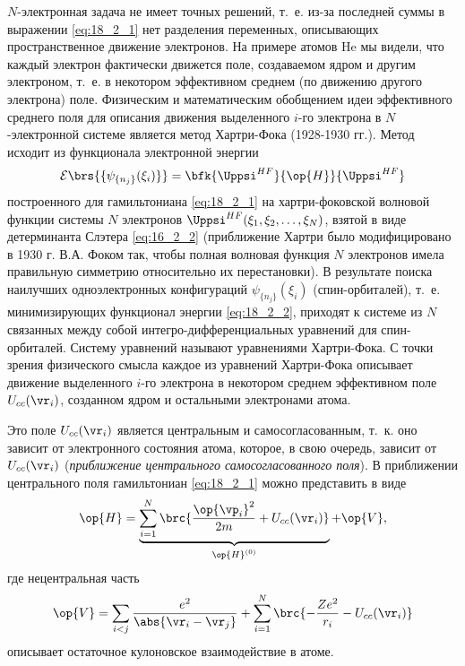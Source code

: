 $N$-электронная задача не имеет точных решений, т.~е. из-за последней суммы в выражении \eqref{eq:18_2_1} нет разделения переменных, описывающих пространственное движение электронов. На примере атомов He мы видели, что каждый электрон фактически движется поле, создаваемом ядром и другим электроном, т.~е. в некотором эффективном среднем (по движению другого электрона) поле. Физическим и математическим обобщением идеи эффективного среднего поля для описания движения выделенного $i$-го электрона в $N$-электронной системе является метод Хартри-Фока (1928-1930 гг.). Метод исходит из функционала электронной энергии
\begin{equation}
\label{eq:18_2_2}
\mathcal{E}\brs{\{\psi_{\{n_j\}}(\xi_i)\}} = \bfk{\Uppsi^{HF}}{\op{H}}{\Uppsi^{HF}}
\end{equation}
построенного для гамильтониана \eqref{eq:18_2_1} на хартри-фоковской волновой функции системы $N$ электронов $\Uppsi^{HF}(\xi_1, \xi_2, \dots, \xi_N)$, взятой в виде детерминанта Слэтера \eqref{eq:16_2_2} (приближение Хартри было модифицировано в 1930 г. В.А. Фоком так, чтобы полная волновая функция $N$ электронов имела правильную симметрию относительно их перестановки). В результате поиска наилучших одноэлектронных конфигураций $\psi_{\{n_j\}}(\xi_i)$ (спин-орбиталей), т.~е. минимизирующих функционал энергии \eqref{eq:18_2_2}, приходят к системе из $N$ связанных между собой интегро-дифференциальных уравнений для спин-орбиталей. Систему уравнений называют уравнениями Хартри-Фока. С точки зрения физического смысла каждое из уравнений Хартри-Фока описывает движение выделенного $i$-го электрона в некотором среднем эффективном поле $U_{cc}(\vr_i)$, созданном ядром и остальными электронами атома. 


Это поле $U_{cc}(\vr_i)$ является центральным и самосогласованным, т.~к. оно зависит от электронного состояния атома, которое, в свою очередь, зависит от $U_{cc}(\vr_i)$ ({\em приближение центрального самосогласованного поля}). В приближении центрального поля гамильтониан \eqref{eq:18_2_1} можно представить в виде
\begin{equation}
\label{eq:18_2_3}
\op{H} = \underbrace{\sum_{i=1}^{N} \brc{\frac{\op{\vp_i}^2}{2m} + U_{cc}(\vr_i)}}_{\op{H}^{(0)}} + \op{V},
\end{equation}
где нецентральная часть
$$
\op{V} = \sum_{i<j} \frac{e^2}{\abs{\vr_i - \vr_j}} + \sum_{i=1}^N \brc{-\frac{Ze^2}{r_i} - U_{cc}(\vr_i)}
$$
описывает остаточное кулоновское взаимодействие в атоме.

